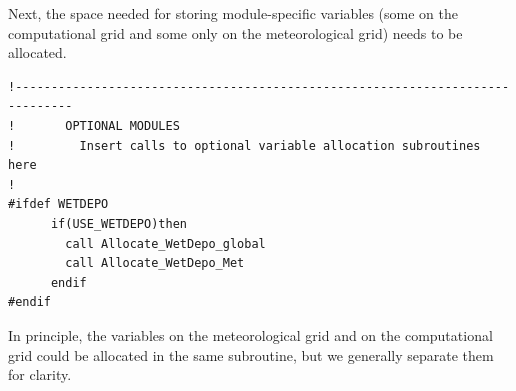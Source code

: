 
Next, the space needed for storing module-specific variables (some on the 
computational grid and some only on the meteorological grid) needs to be
allocated.  
\small
\begin{verbatim}
!------------------------------------------------------------------------------
!       OPTIONAL MODULES
!         Insert calls to optional variable allocation subroutines here
!
#ifdef WETDEPO
      if(USE_WETDEPO)then
        call Allocate_WetDepo_global
        call Allocate_WetDepo_Met
      endif
#endif
\end{verbatim}
\normalsize
In principle, the variables on the meteorological grid and on the computational
grid could be allocated in the same subroutine, but we generally separate them
for clarity.

